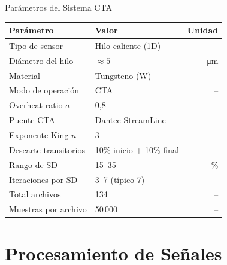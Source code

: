 \documentclass[aspectratio=169,12pt]{beamer}
\begin{document}
\begin{frame}{Parámetros del Sistema CTA}
	\centering
	\begin{tabular}{llr}
		\toprule
		\textbf{Parámetro}    & \textbf{Valor}
		                      & \textbf{Unidad}               \\
		\midrule
		Tipo de sensor        & Hilo caliente (1D)       & -- \\
		Diámetro del hilo     & $\approx 5$
		                      & \si{\micro\metre}             \\
		Material              & Tungsteno (W)            & -- \\
		Modo de operación     & CTA                      & -- \\
		Overheat ratio $a$    & 0,8                      & -- \\
		Puente CTA            & Dantec StreamLine        & -- \\
		Exponente King $n$    & 3                        & -- \\
		Descarte transitorios & 10\% inicio + 10\% final & -- \\
		Rango de SD           & 15--35                   & \% \\
		Iteraciones por SD    & 3--7 (típico 7)          & -- \\
		Total archivos        & 134                      & -- \\
		Muestras por archivo  & 50\,000                  & -- \\
		\bottomrule
	\end{tabular}
\end{frame}

\section{Procesamiento de Señales}
\end{document}
